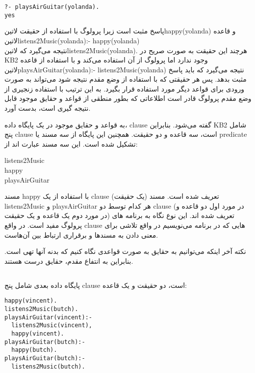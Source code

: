 \begin{latin}
\begin{lstlisting}
?- playsAirGuitar(yolanda).
yes
\end{lstlisting}
\end{latin}

پاسخ مثبت است زیرا پرولوگ با استفاده از حقیقت ‌لاتین{happy(yolanda)} و قاعده \\
 ‌لاتین{listens2Music(yolanda):-  happy(yolanda)} \\
نتیجه می‌گیرد که ‌لاتین{listens2Music(yolanda)}. هرچند این حقیقت به صورت صریح در KB2 وجود ندارد اما پرولوگ از آن استفاده می‌کند و با استفاده از قاعده ‌لاتین{playsAirGuitar(yolanda):-  listens2Music(yolanda)}  نتیجه می‌گیرد که باید پاسخ مثبت بدهد. پس هر حقیقتی که با استفاده از وضع مقدم نتیجه شود می‌تواند به صورت ورودی برای قواعد دیگر مورد استفاده قرار بگیرد. به این ترتیب با استفاده زنجیری از وضع مقدم پرولوگ قادر است اطلاعاتی که بطور منطقی از قواعد و حقایق موجود قابل نتیجه گیری است، بدست آورد.

به قواعد و حقایق موجود در یک پایگاه داده، clause گفته می‌شود. بنابراین KB2 شامل پنج clause است، سه قاعده و دو حقیقت. همچنین این پایگاه از سه مسند یا predicate تشکیل شده است. این سه مسند عبارت اند از:

\begin{latin}
listens2Music \\
happy \\
playsAirGuitar \\
\end{latin}

مسند happy با استفاده از یک clause (یک حقیقت) تعریف شده است. مسند listens2Music و playsAirGuitar هر کدام توسط دو clause (در مورد اول دو قاعده و در مورد دوم یک قاعده و یک حقیقت) تعریف شده اند. این نوع نگاه به برنامه های پرولوگ مفید است. در واقع clause هایی که در برنامه می‌نویسیم در واقع تلاشی برای معنی دادن به مسندها و برقراری ارتباط بین آن‌هاست.

نکته آخر اینکه می‌توانیم به حقایق به صورت قواعدی نگاه کنیم که بدنه آنها تهی است. بنابراین به انتفاع مقدم، حقایق درست هستند.

\subsection{}
پایگاه داده بعدی شامل پنج clause است، دو حقیقت و یک قاعده:

\begin{latin}
\begin{lstlisting}[title=KB3]
happy(vincent).
listens2Music(butch).
playsAirGuitar(vincent):-
  listens2Music(vincent),
  happy(vincent).
playsAirGuitar(butch):-
  happy(butch).
playsAirGuitar(butch):-
  listens2Music(butch).
\end{lstlisting}
\end{latin}

